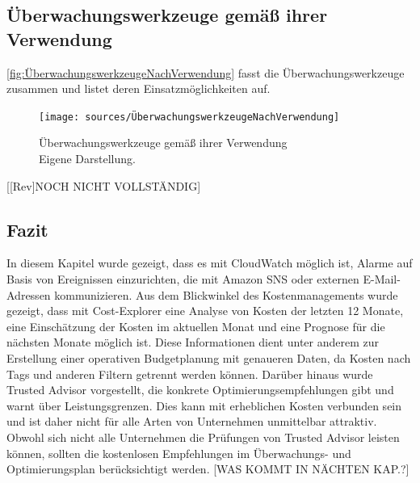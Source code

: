 \subsection{Überwachungswerkzeuge gemäß ihrer Verwendung}
\autoref{fig:ÜberwachungswerkzeugeNachVerwendung} fasst die Überwachungswerkzeuge zusammen und listet deren Einsatzmöglichkeiten auf.
\begin{figure}[h!]
  \centering
  \texttt{[image: sources/ÜberwachungswerkzeugeNachVerwendung]}
  \caption[Überwachungswerkzeuge gemäß ihrer Verwendung]{}
  \label{fig:ÜberwachungswerkzeugeNachVerwendung} 
  Überwachungswerkzeuge gemäß ihrer Verwendung\\
  Eigene Darstellung\cite{AMZ12, AMZ20, AMZ21}. 
\end{figure}
[[Rev]NOCH NICHT VOLLSTÄNDIG]


\subsection*{Fazit}
In diesem Kapitel wurde gezeigt, dass es mit CloudWatch möglich ist, Alarme auf Basis von Ereignissen einzurichten, die mit Amazon SNS oder externen E-Mail-Adressen kommunizieren. %
Aus dem Blickwinkel des Kostenmanagements wurde gezeigt, dass mit Cost-Explorer eine Analyse von Kosten der letzten 12 Monate, eine Einschätzung der Kosten im aktuellen Monat und eine Prognose für die nächsten Monate möglich ist. Diese Informationen dient unter anderem zur Erstellung einer operativen Budgetplanung mit genaueren Daten, da
Kosten nach Tags und anderen Filtern getrennt werden können.
Darüber hinaus wurde Trusted Advisor vorgestellt, die konkrete Optimierungsempfehlungen gibt und warnt über Leistungsgrenzen. Dies kann mit erheblichen Kosten verbunden sein und ist daher nicht für alle Arten von Unternehmen unmittelbar attraktiv. Obwohl sich nicht alle Unternehmen die Prüfungen von Trusted Advisor leisten können, sollten die kostenlosen Empfehlungen im Überwachungs- und Optimierungsplan berücksichtigt werden.
[WAS KOMMT IN NÄCHTEN KAP.?]

